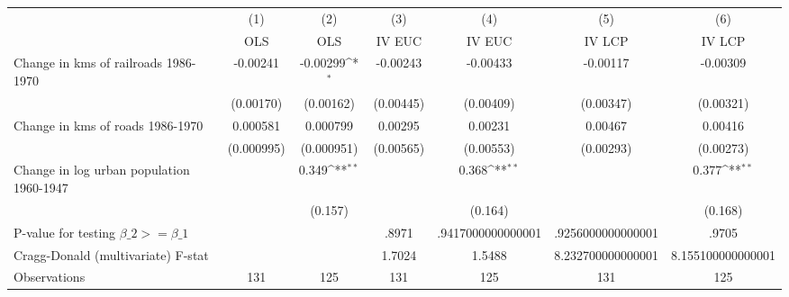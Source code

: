 {
\def\sym#1{\ifmmode^{#1}\else\(^{#1}\)\fi}
\begin{tabular}{l*{6}{c}}
\hline\hline
                &\multicolumn{1}{c}{(1)}&\multicolumn{1}{c}{(2)}&\multicolumn{1}{c}{(3)}&\multicolumn{1}{c}{(4)}&\multicolumn{1}{c}{(5)}&\multicolumn{1}{c}{(6)}\\
                &\multicolumn{1}{c}{OLS}&\multicolumn{1}{c}{OLS}&\multicolumn{1}{c}{IV EUC}&\multicolumn{1}{c}{IV EUC}&\multicolumn{1}{c}{IV LCP}&\multicolumn{1}{c}{IV LCP}\\
\hline
Change in kms of railroads 1986-1970& -0.00241         & -0.00299\sym{*}  & -0.00243         & -0.00433         & -0.00117         & -0.00309         \\
                &(0.00170)         &(0.00162)         &(0.00445)         &(0.00409)         &(0.00347)         &(0.00321)         \\
[1em]
Change in kms of roads 1986-1970& 0.000581         & 0.000799         &  0.00295         &  0.00231         &  0.00467         &  0.00416         \\
                &(0.000995)         &(0.000951)         &(0.00565)         &(0.00553)         &(0.00293)         &(0.00273)         \\
[1em]
Change in log urban population 1960-1947&                  &    0.349\sym{**} &                  &    0.368\sym{**} &                  &    0.377\sym{**} \\
                &                  &  (0.157)         &                  &  (0.164)         &                  &  (0.168)         \\
\hline
P-value for testing $\beta\_{2} >= \beta\_{1}$&                  &                  &    .8971         &.9417000000000001         &.9256000000000001         &    .9705         \\
Cragg-Donald (multivariate) F-stat&                  &                  &   1.7024         &   1.5488         &8.232700000000001         &8.155100000000001         \\
Observations    &      131         &      125         &      131         &      125         &      131         &      125         \\
\hline\hline
\end{tabular}
}
